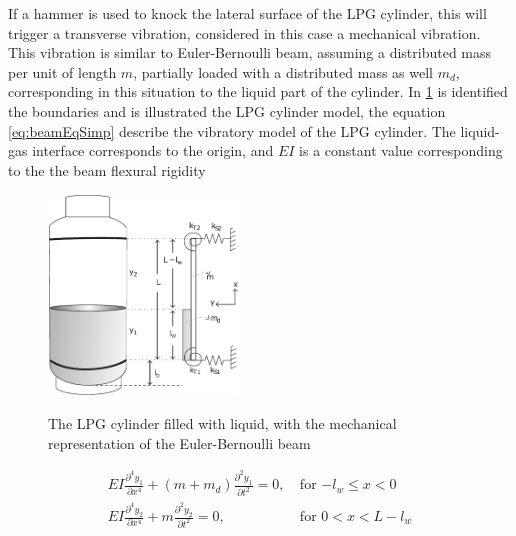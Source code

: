 If a hammer is used to knock the lateral surface of the LPG cylinder, this will trigger a transverse vibration, considered in this case a mechanical vibration. This vibration is similar to Euler-Bernoulli beam, assuming a distributed mass per unit of length $m$, partially loaded with a distributed mass as well $m_d$, corresponding in this situation to the liquid part of the cylinder. In \ref{fig:mechanicalmodel} is identified the boundaries and is illustrated the LPG cylinder model, the  equation \ref{eq:beamEqSimp} describe the vibratory model of the LPG cylinder. The liquid-gas interface corresponds to the origin, and $EI$ is a constant value corresponding to the the beam flexural rigidity
\begin{figure}[]
    \centering
    \includegraphics[width=0.45\textwidth]{Chapters/2CHP/Diagrams/mathmodelLPG.pdf}
    \caption{The LPG cylinder filled with liquid, with the mechanical representation of the Euler-Bernoulli beam}{\cite{wuLiquidLevelDetector2014b}}
    \label{fig:mechanicalmodel}
\end{figure}
\begin{equation} \label{eq:beamEqSimp}
    \begin{split}
        EI\frac{\partial^4y_1}{\partial x^4} + (m + m_d)\frac{\partial^2y_1}{\partial t^2} = 0,\> & \text{for $-l_w \leq x < 0$} \\
        EI\frac{\partial^4y_2}{\partial x^4} + m\frac{\partial^2y_2}{\partial t^2} = 0,\> & \text{for $0 < x < L-l_w$}
    \end{split}
\end{equation}

